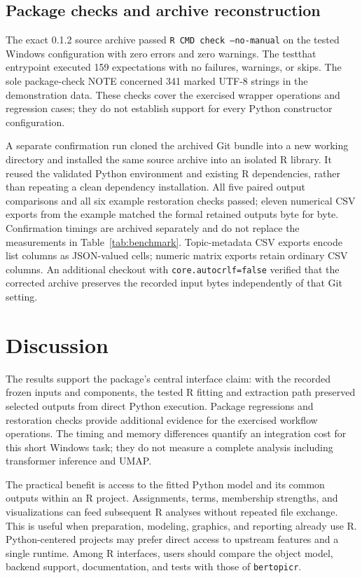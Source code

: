 \documentclass[12pt]{article}
\newcommand{\pkg}[1]{\texttt{#1}}
\newcommand{\code}[1]{\texttt{#1}}
\newcommand{\fcode}[1]{\nolinkurl{#1}}
\begin{document}
\subsection{Package checks and archive reconstruction}

The exact 0.1.2 source archive passed \code{R CMD check --no-manual} on the tested Windows configuration with zero errors and zero warnings. The testthat entrypoint executed 159 expectations with no failures, warnings, or skips. The sole package-check NOTE concerned 341 marked UTF-8 strings in the demonstration data. These checks cover the exercised wrapper operations and regression cases; they do not establish support for every Python constructor configuration.

A separate confirmation run cloned the archived Git bundle into a new working directory and installed the same source archive into an isolated R library. It reused the validated Python environment and existing R dependencies, rather than repeating a clean dependency installation. All five paired output comparisons and all six example restoration checks passed; eleven numerical CSV exports from the example matched the formal retained outputs byte for byte. Confirmation timings are archived separately and do not replace the measurements in Table~\ref{tab:benchmark}. Topic-metadata CSV exports encode list columns as JSON-valued cells; numeric matrix exports retain ordinary CSV columns. An additional checkout with \fcode{core.autocrlf=false} verified that the corrected archive preserves the recorded input bytes independently of that Git setting.

\section{Discussion}

The results support the package's central interface claim: with the recorded frozen inputs and components, the tested R fitting and extraction path preserved selected outputs from direct Python execution. Package regressions and restoration checks provide additional evidence for the exercised workflow operations. The timing and memory differences quantify an integration cost for this short Windows task; they do not measure a complete analysis including transformer inference and UMAP.

The practical benefit is access to the fitted Python model and its common outputs within an R project. Assignments, terms, membership strengths, and visualizations can feed subsequent R analyses without repeated file exchange. This is useful when preparation, modeling, graphics, and reporting already use R. Python-centered projects may prefer direct access to upstream features and a single runtime. Among R interfaces, users should compare the object model, backend support, documentation, and tests with those of \pkg{bertopicr}.
\end{document}
